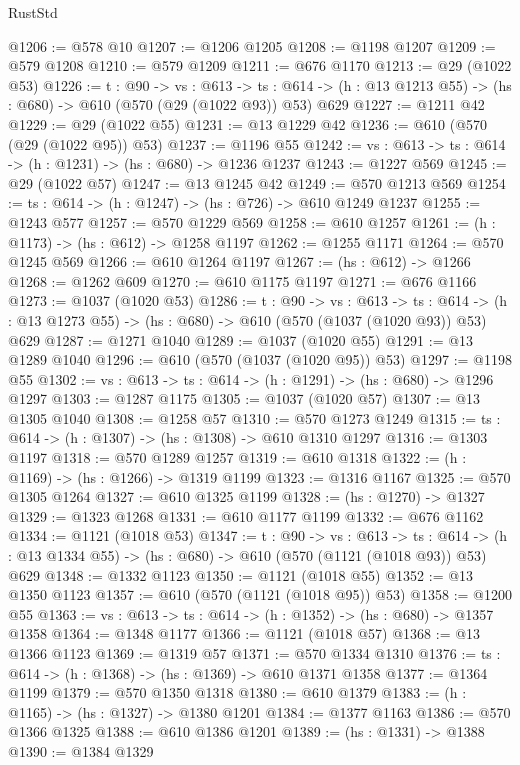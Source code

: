 \begin{lexlean}{RustStd}
\begin{coremodule}
@1206 := @578 @10
@1207 := @1206 @1205
@1208 := @1198 @1207
@1209 := @579 @1208
@1210 := @579 @1209
@1211 := @676 @1170
@1213 := @29 (@1022 @53)
@1226 := {t : @90} ->
  {vs : @613} ->
  {ts : @614} -> (h : @13 @1213 @55) -> (hs : @680) -> @610 (@570 (@29 (@1022 @93)) @53) @629
@1227 := @1211 @42
@1229 := @29 (@1022 @55)
@1231 := @13 @1229 @42
@1236 := @610 (@570 (@29 (@1022 @95)) @53)
@1237 := @1196 @55
@1242 := {vs : @613} -> {ts : @614} -> (h : @1231) -> (hs : @680) -> @1236 @1237
@1243 := @1227 @569
@1245 := @29 (@1022 @57)
@1247 := @13 @1245 @42
@1249 := @570 @1213 @569
@1254 := {ts : @614} -> (h : @1247) -> (hs : @726) -> @610 @1249 @1237
@1255 := @1243 @577
@1257 := @570 @1229 @569
@1258 := @610 @1257
@1261 := (h : @1173) -> (hs : @612) -> @1258 @1197
@1262 := @1255 @1171
@1264 := @570 @1245 @569
@1266 := @610 @1264 @1197
@1267 := (hs : @612) -> @1266
@1268 := @1262 @609
@1270 := @610 @1175 @1197
@1271 := @676 @1166
@1273 := @1037 (@1020 @53)
@1286 := {t : @90} ->
  {vs : @613} ->
  {ts : @614} -> (h : @13 @1273 @55) -> (hs : @680) -> @610 (@570 (@1037 (@1020 @93)) @53) @629
@1287 := @1271 @1040
@1289 := @1037 (@1020 @55)
@1291 := @13 @1289 @1040
@1296 := @610 (@570 (@1037 (@1020 @95)) @53)
@1297 := @1198 @55
@1302 := {vs : @613} -> {ts : @614} -> (h : @1291) -> (hs : @680) -> @1296 @1297
@1303 := @1287 @1175
@1305 := @1037 (@1020 @57)
@1307 := @13 @1305 @1040
@1308 := @1258 @57
@1310 := @570 @1273 @1249
@1315 := {ts : @614} -> (h : @1307) -> (hs : @1308) -> @610 @1310 @1297
@1316 := @1303 @1197
@1318 := @570 @1289 @1257
@1319 := @610 @1318
@1322 := (h : @1169) -> (hs : @1266) -> @1319 @1199
@1323 := @1316 @1167
@1325 := @570 @1305 @1264
@1327 := @610 @1325 @1199
@1328 := (hs : @1270) -> @1327
@1329 := @1323 @1268
@1331 := @610 @1177 @1199
@1332 := @676 @1162
@1334 := @1121 (@1018 @53)
@1347 := {t : @90} ->
  {vs : @613} ->
  {ts : @614} -> (h : @13 @1334 @55) -> (hs : @680) -> @610 (@570 (@1121 (@1018 @93)) @53) @629
@1348 := @1332 @1123
@1350 := @1121 (@1018 @55)
@1352 := @13 @1350 @1123
@1357 := @610 (@570 (@1121 (@1018 @95)) @53)
@1358 := @1200 @55
@1363 := {vs : @613} -> {ts : @614} -> (h : @1352) -> (hs : @680) -> @1357 @1358
@1364 := @1348 @1177
@1366 := @1121 (@1018 @57)
@1368 := @13 @1366 @1123
@1369 := @1319 @57
@1371 := @570 @1334 @1310
@1376 := {ts : @614} -> (h : @1368) -> (hs : @1369) -> @610 @1371 @1358
@1377 := @1364 @1199
@1379 := @570 @1350 @1318
@1380 := @610 @1379
@1383 := (h : @1165) -> (hs : @1327) -> @1380 @1201
@1384 := @1377 @1163
@1386 := @570 @1366 @1325
@1388 := @610 @1386 @1201
@1389 := (hs : @1331) -> @1388
@1390 := @1384 @1329

\end{coremodule}
\end{lexlean}
